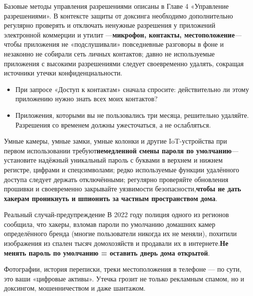 
Базовые методы управления разрешениями описаны в Главе 4 «Управление разрешениями». В контексте защиты от доксинга необходимо дополнительно регулярно проверять и отключать ненужные разрешения у приложений электронной коммерции и утилит —\textbf{микрофон, контакты, местоположение}— чтобы приложения не «подслушивали» повседневные разговоры в фоне и незаконно не собирали сеть личных контактов; давно не используемые приложения с высокими разрешениями следует своевременно удалять, сокращая источники утечки конфиденциальности.

\begin{itemize}
  \item При запросе «Доступ к контактам» сначала спросите: действительно ли этому приложению нужно знать всех моих контактов?
  \item Приложения, которыми вы не пользовались три месяца, решительно удаляйте. Разрешения со временем должны ужесточаться, а не ослабляться.
\end{itemize}


Умные камеры, умные замки, умные колонки и другие IoT-устройства при первом использовании требуют\textbf{немедленной смены пароля по умолчанию}— установите надёжный уникальный пароль с буквами в верхнем и нижнем регистре, цифрами и спецсимволами; редко используемые функции удалённого доступа следует держать отключёнными; регулярно проверяйте обновления прошивки и своевременно закрывайте уязвимости безопасности,\textbf{чтобы не дать хакерам проникнуть и шпионить за частным пространством дома}.

\begin{tcbwarn}{Реальный случай-предупреждение}
В 2022 году полиция одного из регионов сообщила, что хакеры, взломав пароли по умолчанию домашних камер определённого бренда (многие пользователи никогда их не меняли), похитили изображения из спален тысяч домохозяйств и продавали их в интернете.\textbf{Не менять пароль по умолчанию = оставить дверь дома открытой}.

\end{tcbwarn}


Фотографии, история переписки, треки местоположения в телефоне — по сути, это ваши «цифровые активы». Утечка грозит не только рекламным спамом, но и доксингом, мошенничеством и даже шантажом.

